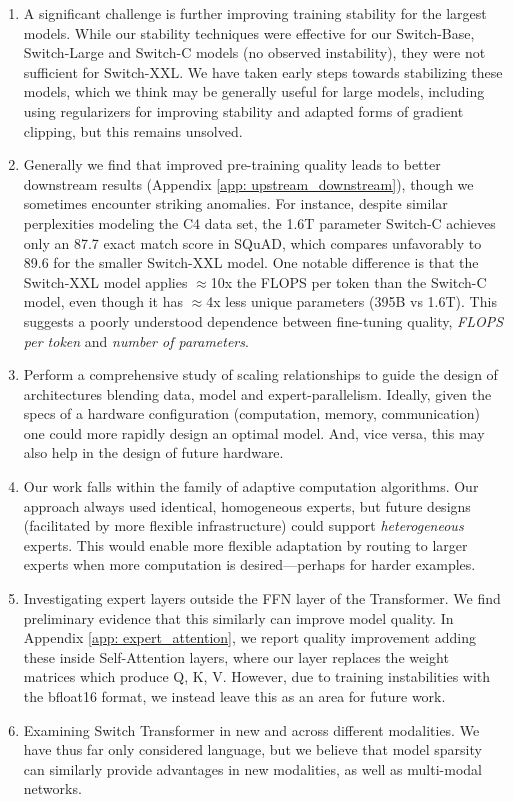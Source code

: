 \documentclass[twoside,11pt]{article}
\begin{document}
\begin{enumerate}%
\item A significant challenge is further improving training stability for the largest models.
While our stability techniques were effective for our Switch-Base, Switch-Large and Switch-C models (no observed instability), they were not sufficient for Switch-XXL.
We have taken early steps towards stabilizing these models, which we think may be generally useful for large models, including using regularizers for improving stability and adapted forms of gradient clipping, but this remains unsolved.

\item Generally we find that improved pre-training quality leads to better downstream results (Appendix \ref{app: upstream_downstream}), though we sometimes encounter striking anomalies.
For instance, despite similar perplexities modeling the C4 data set, the 1.6T parameter Switch-C achieves only an 87.7 exact match score in SQuAD, which compares unfavorably to 89.6 for the smaller Switch-XXL model.
One notable difference is that the Switch-XXL model applies $\approx$10x the FLOPS per token than the Switch-C model, even though it has $\approx$4x less unique parameters (395B vs 1.6T).
This suggests a poorly understood dependence between fine-tuning quality, \emph{FLOPS per token} and \emph{number of parameters}.

\item Perform a comprehensive study of scaling relationships to guide the design of architectures blending data, model and expert-parallelism.
Ideally, given the specs of a hardware configuration (computation, memory, communication) one could more rapidly design an optimal model.
And, vice versa, this may also help in the design of future hardware.

\item Our work falls within the family of adaptive computation algorithms.
Our approach always used identical, homogeneous experts, but future designs (facilitated by more flexible infrastructure) could support \emph{heterogeneous} experts.
This would enable more flexible adaptation by routing to larger experts when more computation is desired---perhaps for harder examples.

\item Investigating expert layers outside the FFN layer of the Transformer.
We find preliminary evidence that this similarly can improve model quality.
In Appendix \ref{app: expert_attention}, we report quality improvement adding these inside Self-Attention layers, where our layer replaces the weight matrices which produce Q, K, V.
However, due to training instabilities with the bfloat16 format, we instead leave this as an area for future work.

\item Examining Switch Transformer in new and across different modalities. We have thus far only considered language, but we believe that model sparsity can similarly provide advantages in new modalities, as well as multi-modal networks.
\end{enumerate}
\end{document}
